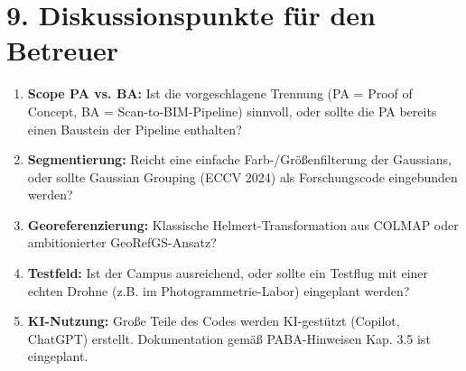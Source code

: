 \documentclass[11pt, a4paper]{article}
\begin{document}
\section*{9. Diskussionspunkte für den Betreuer}

\begin{enumerate}[noitemsep]
    \item \textbf{Scope PA vs. BA:} Ist die vorgeschlagene Trennung (PA = Proof of Concept, BA = Scan-to-BIM-Pipeline) sinnvoll, oder sollte die PA bereits einen Baustein der Pipeline enthalten?
    \item \textbf{Segmentierung:} Reicht eine einfache Farb-/Größenfilterung der Gaussians, oder sollte Gaussian Grouping (ECCV 2024) als Forschungscode eingebunden werden?
    \item \textbf{Georeferenzierung:} Klassische Helmert-Transformation aus COLMAP oder ambitionierter GeoRefGS-Ansatz?
    \item \textbf{Testfeld:} Ist der Campus ausreichend, oder sollte ein Testflug mit einer echten Drohne (z.B. im Photogrammetrie-Labor) eingeplant werden?
    \item \textbf{KI-Nutzung:} Große Teile des Codes werden KI-gestützt (Copilot, ChatGPT) erstellt. Dokumentation gemäß PABA-Hinweisen Kap. 3.5 ist eingeplant.
\end{enumerate}
\end{document}
